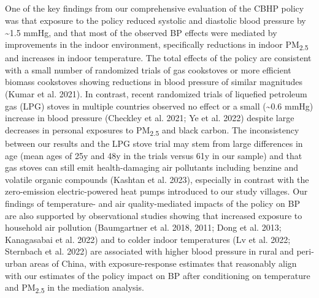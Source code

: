 \documentclass[
  letterpaper,
  DIV=11,
  numbers=noendperiod]{scrartcl}
\providecommand{\DIFaddtex}[1]{{\protect\color{blue}\uwave{#1}}} %
\providecommand{\DIFaddbegin}{} %
\providecommand{\DIFaddend}{} %
\providecommand{\DIFdelbegin}{} %
\providecommand{\DIFdelend}{} %
\providecommand{\DIFadd}[1]{\texorpdfstring{\DIFaddtex{#1}}{#1}} %
\newcommand{\DIFscaledelfig}{0.5}
\newlength{\DIFdelgraphicswidth} %
\newlength{\DIFdelgraphicsheight} %
\newcommand{\DIFaddincludegraphics}[2][]{{\color{blue}\fbox{\DIFOincludegraphics[#1]{#2}}}} %
\newcommand{\DIFdelincludegraphics}[2][]{%
\sbox{\DIFdelgraphicsbox}{\DIFOincludegraphics[#1]{#2}}%
\settoboxwidth{\DIFdelgraphicswidth}{\DIFdelgraphicsbox} %
\settoboxtotalheight{\DIFdelgraphicsheight}{\DIFdelgraphicsbox} %
\scalebox{\DIFscaledelfig}{%
\parbox[b]{\DIFdelgraphicswidth}{\usebox{\DIFdelgraphicsbox}\\[-\baselineskip] \rule{\DIFdelgraphicswidth}{0em}}\llap{\resizebox{\DIFdelgraphicswidth}{\DIFdelgraphicsheight}{%
\setlength{\unitlength}{\DIFdelgraphicswidth}%
\begin{picture}(1,1)%
\thicklines\linethickness{2pt} %
{\color[rgb]{1,0,0}\put(0,0){\framebox(1,1){}}}%
{\color[rgb]{1,0,0}\put(0,0){\line( 1,1){1}}}%
{\color[rgb]{1,0,0}\put(0,1){\line(1,-1){1}}}%
\end{picture}%
}\hspace*{3pt}}} %
} %
\DeclareRobustCommand{\DIFaddbegin}{\DIFOaddbegin \let\includegraphics\DIFaddincludegraphics} %
\DeclareRobustCommand{\DIFaddend}{\DIFOaddend \let\includegraphics\DIFOincludegraphics} %
\DeclareRobustCommand{\DIFdelbegin}{\DIFOdelbegin \let\includegraphics\DIFdelincludegraphics} %
\DeclareRobustCommand{\DIFdelend}{\DIFOaddend \let\includegraphics\DIFOincludegraphics} %
\begin{document}
\DIFdelbegin %
\DIFdelend \DIFaddbegin \subsection{\DIFadd{Impacts of the policy on
health}}\label{impacts-of-the-policy-on-health}
\DIFaddend 

One of the key findings from our comprehensive evaluation of the CBHP
policy was that exposure to the policy reduced systolic and diastolic
blood pressure by \textasciitilde1.5 mmHg, and that most of the observed
BP effects were mediated by improvements in the indoor environment,
specifically reductions in indoor PM\textsubscript{2.5} and increases in
indoor temperature. The total effects of the policy are consistent with
a small number of randomized trials of gas cookstoves or more efficient
biomass cookstoves showing reductions in blood pressure of similar
magnitudes (Kumar et al. 2021). In contrast, recent randomized trials of
liquefied petroleum gas (LPG) stoves in multiple countries observed no
effect or a small (\textasciitilde0.6 mmHg) increase in blood pressure
(Checkley et al. 2021; Ye et al. 2022) despite large decreases in
personal exposures to PM\textsubscript{2.5} and black carbon. The
inconsistency between our results and the LPG stove trial may stem from
large differences in age (mean ages of 25y and 48y in the trials versus
61y in our sample) and that gas stoves can still emit health-damaging
air pollutants including benzine and volatile organic compounds (Kashtan
et al. 2023), especially in contrast with the zero-emission
electric-powered heat pumps introduced to our study villages. Our
findings of temperature- and air quality-mediated impacts of the policy
on BP are also supported by observational studies showing that increased
exposure to household air pollution (Baumgartner et al. 2018, 2011; Dong
et al. 2013; Kanagasabai et al. 2022) and to colder indoor temperatures
(Lv et al. 2022; Sternbach et al. 2022) are associated with higher blood
pressure in rural and peri-urban areas of China, with exposure-response
estimates that reasonably align with our estimates of the policy impact
on BP after conditioning on temperature and PM\textsubscript{2.5} in the
mediation analysis.
\end{document}
